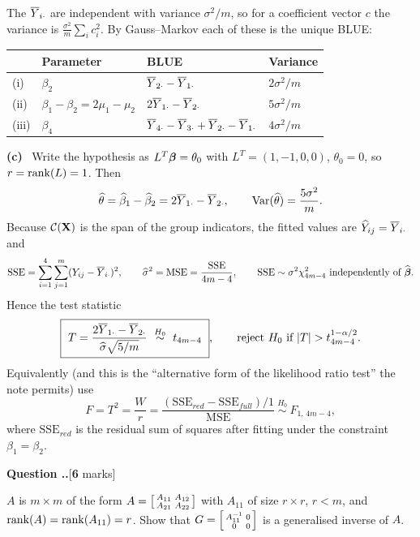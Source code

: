 \documentclass[11pt]{article}
\newcommand{\wh}[1]{\widehat{#1}}
\newcommand{\SSE}{\mathrm{SSE}}
\newcommand{\MSE}{\mathrm{MSE}}
\newcounter{qq}[section]
\newcommand{\qhead}[2]{\medskip\refstepcounter{qq}%
  \noindent\textbf{\color{Blue}Question \thesection.\theqq.}\hfill\textnormal{[\textbf{#1} marks]}%
  \ifx\relax#2\relax\else\par\smallskip\fi}
\newcommand{\pt}[1]{\smallskip\noindent\textbf{(#1)}\ }
\begin{document}
The $\overline{Y}_{i\cdot}$ are independent with variance $\sigma^2/m$, so for a coefficient vector
$c$ the variance is $\tfrac{\sigma^2}{m}\sum_ic_i^2$. By Gauss--Markov each of these is the
unique BLUE:

\begin{center}
\begin{tabular}{@{}llll@{}}
\toprule
& Parameter & BLUE & Variance\\
\midrule
(i) & $\beta_2$ & $\overline{Y}_{2\cdot}-\overline{Y}_{1\cdot}$ & $2\sigma^2/m$\\
(ii) & $\beta_1-\beta_2=2\mu_1-\mu_2$ & $2\overline{Y}_{1\cdot}-\overline{Y}_{2\cdot}$ & $5\sigma^2/m$\\
(iii) & $\beta_4$ & $\overline{Y}_{4\cdot}-\overline{Y}_{3\cdot}+\overline{Y}_{2\cdot}-\overline{Y}_{1\cdot}$ & $4\sigma^2/m$\\
\bottomrule
\end{tabular}
\end{center}

\pt{c} Write the hypothesis as $L^T\boldsymbol{\beta}=\theta_0$ with $L^T=(1,-1,0,0)$, $\theta_0=0$,
so $r=\operatorname{rank}(L)=1$. Then
\[
  \wh\theta=\wh\beta_1-\wh\beta_2=2\Ybar_{1\cdot}-\Ybar_{2\cdot},
  \qquad
  \Var(\wh\theta)=\frac{5\sigma^2}{m}.
\]
Because $\mathcal{C}(\mathbf{X})$ is the span of the group indicators, the fitted values are
$\wh Y_{ij}=\Ybar_{i\cdot}$ and
\[
  \SSE=\sum_{i=1}^4\sum_{j=1}^m(Y_{ij}-\Ybar_{i\cdot})^2,
  \qquad
  \wh\sigma^2=\MSE=\frac{\SSE}{4m-4},
  \qquad \SSE\sim\sigma^2\chi^2_{4m-4}\ \text{independently of }\wh\bb.
\]
Hence the test statistic
\[
  \boxed{\ T=\frac{2\Ybar_{1\cdot}-\Ybar_{2\cdot}}{\wh\sigma\sqrt{5/m}}
  \ \overset{H_0}{\sim}\ t_{4m-4}\ },
  \qquad\text{reject }H_0\text{ if } |T|>t^{1-\alpha/2}_{4m-4}.
\]
Equivalently (and this is the ``alternative form of the likelihood ratio test'' the note
permits) use
\[
  F=T^2=\frac{W}{r}=\frac{(\SSE_{red}-\SSE_{full})/1}{\MSE}\ \overset{H_0}{\sim}\ F_{1,\,4m-4},
\]
where $\SSE_{red}$ is the residual sum of squares after fitting under the constraint
$\beta_1=\beta_2$.

\qhead{6}{}
\begin{stmt}
$A$ is $m\times m$ of the form $A=\begin{bsmallmatrix}A_{11}&A_{12}\\A_{21}&A_{22}\end{bsmallmatrix}$
with $A_{11}$ of size $r\times r$, $r<m$, and $\operatorname{rank}(A)=\operatorname{rank}(A_{11})=r$. Show that
$G=\begin{bsmallmatrix}A_{11}^{-1}&0\\0&0\end{bsmallmatrix}$ is a generalised inverse of $A$.
\end{stmt}
\end{document}
